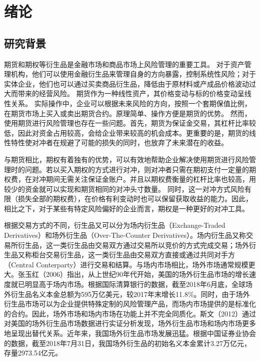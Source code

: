 
\chapter{绪论}
\label{chap:intro}

\section{研究背景}

期货和期权等衍生品是金融市场和商品市场上风险管理的重要工具。
对于资产管理机构，他们可以使用金融衍生品来管理自身的方向暴露，控制系统性风险；对于实体企业，他们也可以通过买卖商品衍生品，降低由于原材料或产成品价格波动过大而带来的经营风险。
期货作为一种线性资产，其价格变动与标的价格变动呈线性关系。
实际操作中，企业可以根据未来风险的方向，按照一个套期保值比例，在期货市场上买入或卖出期货合约。原理简单、操作方便是期货的优势。
然而，使用期货进行风险管理也存在一些问题。首先，期货为保证金交易，其杠杆比率较低，因此对资金占用较高，会给企业带来较高的机会成本。更重要的是，期货的线性特性使对冲者在规避了可能的损失的同时，也放弃了未来潜在的收益。

与期货相比，期权有着独有的优势，可以有效地帮助企业解决使用期货进行风险管理时的问题。若以买入期权的方式进行对冲，则对冲者只需在期初支付一定量的期权费，在对冲期间无需关注保证金账户。并且以期权费衡量的杠杆比率也较高，用较少的资金就可以实现和期货相同的对冲头寸数量。
同时，这一对冲方式风险有限（损失全部的期权费），在价格有利变动时也可以保留获取收益的能力。因此，相比之下，对于某些有特定风险偏好的企业而言，期权是一种更好的对冲工具。

根据交易方式的不同，衍生品又可以分为场内衍生品（Exchange-Traded Derivatives）和场外衍生品（Over-The-Counter Derivatives）。场内衍生品又称交易所衍生品，这一类衍生品由交易双方通过交易所以竞价的方式完成交易；场外衍生品又称柜台交易衍生品，这一类衍生品由交易双方直接或通过共同对手方（Central Conterparty）进行交易和结算。与场内市场相比，场外市场通常规模更大。张玉红（2006）指出，从上世纪90年代开始，美国的场外衍生品市场的增长速度就已明显高于场内市场。根据国际清算银行的数据，截至2018年6月底，全球场外衍生品名义本金总额为595万亿美元，较2017年末增长11.8\%。同时，由于场外衍生品市场可以为企业提供特殊定制的风险管理产品，而场内市场提供的是标准化的合约。因此，场外市场和场内市场在功能上并不完全同质化。斯文（2012）通过对美国的场外衍生品市场数据进行实证分析发现，场外衍生品市场和场内市场更多地呈现出替代关系。近年来，我国场外衍生品市场发展迅猛。根据中国证券业协会的数据，截至2018年7月31日，我国场外衍生品的初始名义本金累计3.27万亿元，存量2973.54亿元。

